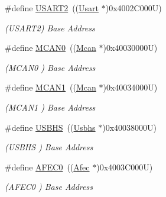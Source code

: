 \begin{DoxyCompactItemize}
\#define \mbox{\hyperlink{group__SAME70J19__base_gaf114a9eab03ca08a6fb720e511595930}{U\+S\+A\+R\+T2}}~((\mbox{\hyperlink{structUsart}{Usart}}  $\ast$)0x4002\+C000\+U)
\begin{DoxyCompactList}\small\item\em (U\+S\+A\+R\+T2) Base Address \end{DoxyCompactList}\item 
\mbox{\label{group__SAME70J19__base_ga62271f9edf0bac775c2e648d8b0090ea}} 
\#define \mbox{\hyperlink{group__SAME70J19__base_ga62271f9edf0bac775c2e648d8b0090ea}{M\+C\+A\+N0}}~((\mbox{\hyperlink{structMcan}{Mcan}}   $\ast$)0x40030000\+U)
\begin{DoxyCompactList}\small\item\em (M\+C\+A\+N0 ) Base Address \end{DoxyCompactList}\item 
\mbox{\label{group__SAME70J19__base_gae7d0623b133982dd0e1158c12490cb31}} 
\#define \mbox{\hyperlink{group__SAME70J19__base_gae7d0623b133982dd0e1158c12490cb31}{M\+C\+A\+N1}}~((\mbox{\hyperlink{structMcan}{Mcan}}   $\ast$)0x40034000\+U)
\begin{DoxyCompactList}\small\item\em (M\+C\+A\+N1 ) Base Address \end{DoxyCompactList}\item 
\mbox{\label{group__SAME70J19__base_ga583c4e09fb87b6c2e14fd1f6c8f344f9}} 
\#define \mbox{\hyperlink{group__SAME70J19__base_ga583c4e09fb87b6c2e14fd1f6c8f344f9}{U\+S\+B\+HS}}~((\mbox{\hyperlink{structUsbhs}{Usbhs}}  $\ast$)0x40038000\+U)
\begin{DoxyCompactList}\small\item\em (U\+S\+B\+HS ) Base Address \end{DoxyCompactList}\item 
\mbox{\label{group__SAME70J19__base_ga661c328521742210ed8335474589af9f}} 
\#define \mbox{\hyperlink{group__SAME70J19__base_ga661c328521742210ed8335474589af9f}{A\+F\+E\+C0}}~((\mbox{\hyperlink{structAfec}{Afec}}   $\ast$)0x4003\+C000\+U)
\begin{DoxyCompactList}\small\item\em (A\+F\+E\+C0 ) Base Address \end{DoxyCompactList}\item 

\end{DoxyCompactItemize}
